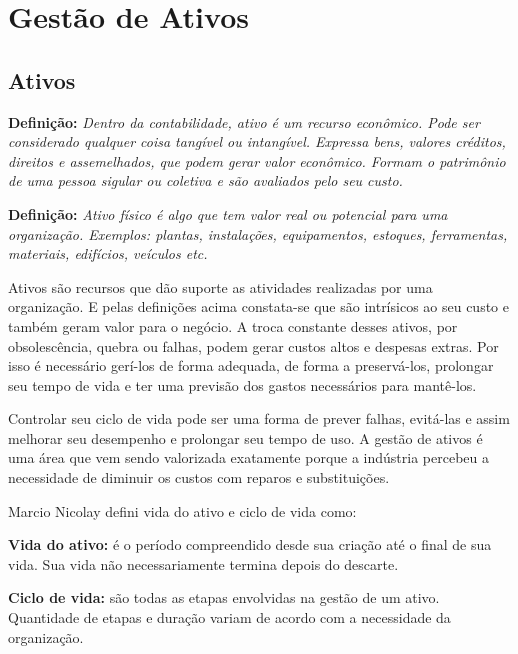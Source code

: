 \chapter{Gestão de Ativos}
\label{cap-ativos}

\section{Ativos}

\textbf{Definição:} \emph{Dentro da contabilidade, ativo é um recurso econômico. Pode ser considerado qualquer coisa tangível ou intangível. Expressa bens, valores créditos, direitos e assemelhados, que podem gerar valor econômico. Formam o patrimônio de uma pessoa sigular ou coletiva e são avaliados pelo seu custo.} \cite{sullivan2003}\cite{fulgencio2007} 

\textbf{Definição:} \emph{Ativo físico é algo que tem valor real ou potencial para uma organização.
Exemplos: plantas, instalações, equipamentos, estoques, ferramentas, materiais, edifícios, veículos etc.} \cite{nicolay2015}

Ativos são recursos que dão suporte as atividades realizadas por uma organização. E pelas definições acima constata-se que são intrísicos ao seu custo e também geram valor para o negócio. A troca constante desses ativos, por obsolescência, quebra ou falhas, podem gerar custos altos e despesas extras. Por isso é necessário gerí-los de forma adequada, de forma a preservá-los, prolongar seu tempo de vida e ter uma previsão dos gastos necessários para mantê-los. 

Controlar seu ciclo de vida pode ser uma forma de prever falhas, evitá-las e assim melhorar seu desempenho e prolongar seu tempo de uso. A gestão de ativos é uma área que vem sendo valorizada exatamente porque a indústria percebeu a necessidade de diminuir os custos com reparos e substituições.

Marcio Nicolay \cite{nicolay2015} defini vida do ativo e ciclo de vida como:

\textbf{Vida do ativo:} é o período compreendido desde sua criação até o final de sua vida. Sua vida não necessariamente termina depois do descarte.

\textbf{Ciclo de vida:} são todas as etapas envolvidas na gestão de um ativo. Quantidade de etapas e duração variam de acordo com a necessidade da organização.

